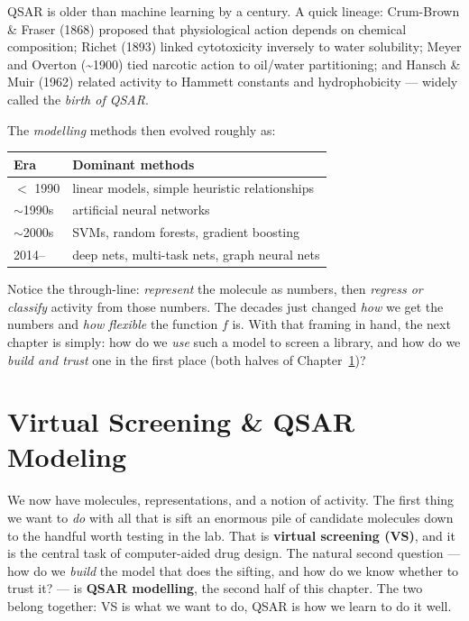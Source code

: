 \documentclass[11pt, oneside]{book}
\begin{document}
QSAR is older than machine learning by a century. A quick lineage: Crum-Brown \&
Fraser (1868) proposed that physiological action depends on chemical composition;
Richet (1893) linked cytotoxicity inversely to water solubility; Meyer and Overton
(\textasciitilde 1900) tied narcotic action to oil/water partitioning; and
Hansch \& Muir (1962) related activity to Hammett constants and hydrophobicity ---
widely called the \emph{birth of QSAR}.


The \emph{modelling} methods then evolved roughly as:

\begin{center}
\small
\begin{tabular}{ll}
\toprule
\textbf{Era} & \textbf{Dominant methods} \\
\midrule
$<$ 1990   & linear models, simple heuristic relationships \\
$\sim$1990s & artificial neural networks \\
$\sim$2000s & SVMs, random forests, gradient boosting \\
2014--      & deep nets, multi-task nets, graph neural nets \\
\bottomrule
\end{tabular}
\end{center}

\begin{intbox}
Notice the through-line: \emph{represent} the molecule as numbers, then
\emph{regress or classify} activity from those numbers. The decades just changed
\emph{how} we get the numbers and \emph{how flexible} the function $f$ is. With
that framing in hand, the next chapter is simply: how do we \emph{use} such a
model to screen a library, and how do we \emph{build and trust} one in the first
place (both halves of Chapter~\ref{chap:vsqsar})?
\end{intbox}


\chapter{Virtual Screening \& QSAR Modeling}
\label{chap:vsqsar}

We now have molecules, representations, and a notion of activity. The first thing
we want to \emph{do} with all that is sift an enormous pile of candidate molecules
down to the handful worth testing in the lab. That is \textbf{virtual screening
(VS)}, and it is the central task of computer-aided drug design. The natural
second question --- how do we \emph{build} the model that does the sifting, and
how do we know whether to trust it? --- is \textbf{QSAR modelling}, the second
half of this chapter. The two belong together: VS is what we want to do, QSAR is
how we learn to do it well.
\end{document}
